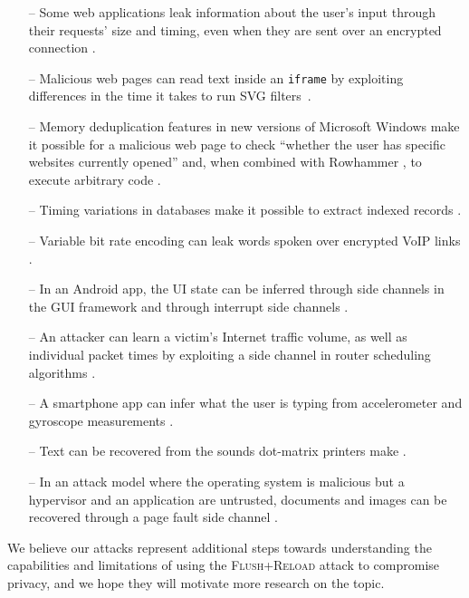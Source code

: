 \documentclass[letterpaper,twocolumn,10pt]{article}
\begin{document}
\begin{itemize}
    \item[--] Some web applications leak information about the user's input
        through their requests' size and timing, even when they are sent over an
        encrypted connection \cite{bortz2007exposing, chen2010side}.
    \item[--] Malicious web pages can read text inside an \texttt{iframe} by
        exploiting differences in the time it takes to run SVG
        filters~\cite{pixelperfect, andrysco2015subnormal}. 
    \item[--] Memory deduplication features in new versions of Microsoft Windows
        make it possible for a malicious web page to check ``whether the user
        has specific websites currently opened'' \cite{gruss2015practical} and,
        when combined with Rowhammer \cite{kim2014flipping}, to execute
        arbitrary code \cite{bosman2016dedup}.
    \item[--] Timing variations in databases make it possible to extract
          indexed records \cite{futoransky2007nd2db}.
    \item[--] Variable bit rate encoding can leak words spoken over encrypted
        VoIP links \cite{white2011phonotactic}.
    \item[--] In an Android app, the UI state can be inferred through side
        channels in the GUI framework \cite{chen2014peeking} and through
        interrupt side channels \cite{diao2016no}.
    \item[--] An attacker can learn a victim's Internet traffic volume, as well as
          individual packet times by exploiting a side channel in router
          scheduling algorithms \cite{kadloor2010low}.
    \item[--] A smartphone app can infer what the user is typing from accelerometer
          and gyroscope measurements \cite{owusu2012accessory,
          cai2012practicality}.
    \item[--] Text can be recovered from the sounds dot-matrix printers make
          \cite{backes2010acoustic}.
    \item[--] In an attack model where the operating system is malicious but
        a hypervisor and an application are untrusted, documents and images can
        be recovered through a page fault side channel \cite{xu2011exploration}.
\end{itemize}

We believe our attacks represent additional steps towards understanding the
capabilities and limitations of using the \textsc{Flush+Reload} attack to
compromise privacy, and we hope they will motivate more research on the topic.
\end{document}

